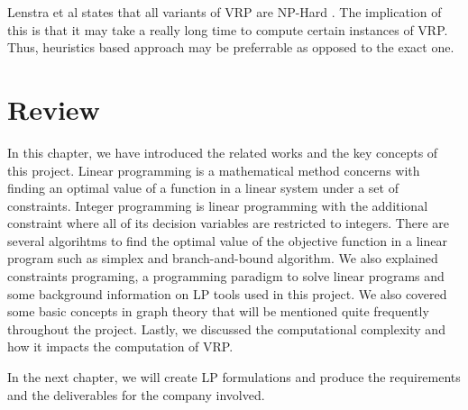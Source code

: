 Lenstra et al states that all variants of VRP are NP-Hard \cite{Lenstra1981}. The implication of this is that it may
take a really long time to compute certain instances of VRP. Thus, heuristics based approach may be preferrable as opposed to
the exact one.

\section{Review}
In this chapter, we have introduced the related works and the key concepts of this project. Linear programming is a
mathematical method concerns with finding an optimal value of a function in a linear system under a set of constraints. Integer
programming is linear programming with the additional constraint where all of its decision variables are restricted to integers.
There are several algorihtms to find the optimal value of the objective function in a linear program such as simplex and branch-and-bound
algorithm. We also explained constraints programing, a programming paradigm to solve linear programs and
some background information on LP tools used in this project. We also covered some basic
concepts in graph theory that will be mentioned quite frequently throughout the project. Lastly, we discussed the
computational complexity and how it impacts the computation of VRP.

In the next chapter, we will create LP formulations and produce the requirements and the deliverables for the company involved.